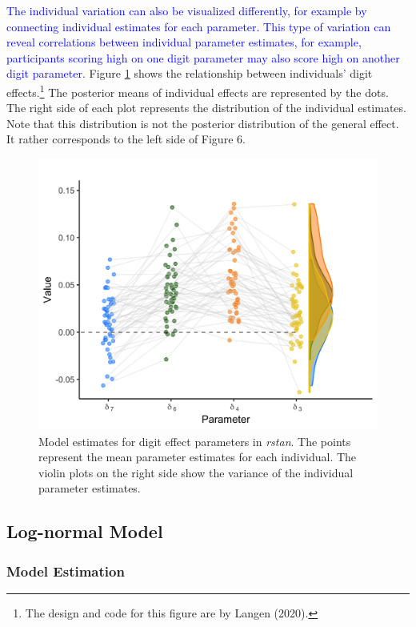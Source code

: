 \documentclass[
  english,
  doc,floatsintext]{apa6}
\begin{document}
\textcolor{blue}{The individual variation can also be visualized differently, for example by connecting individual estimates for each parameter. This type of variation can reveal correlations between individual parameter estimates, for example, participants scoring high on one digit parameter may also score high on another digit parameter.} Figure \ref{fig:modelestimatesfigure3} shows the relationship between individuals' digit effects.\footnote{The design and code for this figure are by Langen (2020).} The posterior means of individual effects are represented by the dots. The right side of each plot represents the distribution of the individual estimates. Note that this distribution is not the posterior distribution of the general effect. It rather corresponds to the left side of Figure 6.

\begin{figure}[H]

\includegraphics[width=0.75\linewidth]{I - Images/Fig11_modelestimatefigure2_onlyrstan_v2} \hfill{}

\caption{Model estimates for digit effect parameters in \textit{rstan}. The points represent the mean parameter estimates for each individual. The violin plots on the right side show the variance of the individual parameter estimates. }\label{fig:modelestimatesfigure3}
\end{figure}

\hypertarget{log-normal-model-2}{%
\subsection{Log-normal Model}\label{log-normal-model-2}}

\hypertarget{model-estimation}{%
\subsubsection{Model Estimation}\label{model-estimation}}
\end{document}
